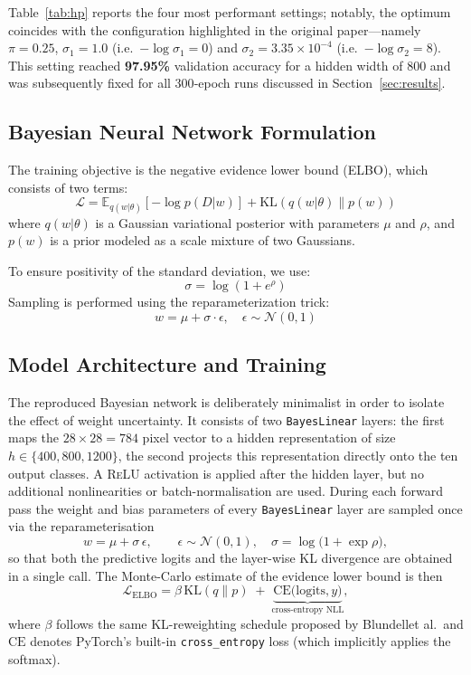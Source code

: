 \documentclass{article}
\begin{document}
Table~\ref{tab:hp} reports the four most performant settings; notably, the optimum coincides with the configuration highlighted in the original paper—namely $\pi=0.25$, $\sigma_{1}=1.0$ (i.e.\ $-\!\log\sigma_1=0$) and $\sigma_{2}=3.35\times10^{-4}$ (i.e.\ $-\!\log\sigma_2=8$).  
This setting reached \textbf{97.95\%} validation accuracy for a hidden width of 800 and was subsequently fixed for all 300‑epoch runs discussed in Section~\ref{sec:results}.

\subsection{Bayesian Neural Network Formulation}

The training objective is the negative evidence lower bound (ELBO), which consists of two terms:
\[
\mathcal{L} = \mathbb{E}_{q(w|\theta)} [-\log p(D|w)] + \mathrm{KL}(q(w|\theta) \| p(w))
\]
where $q(w|\theta)$ is a Gaussian variational posterior with parameters $\mu$ and $\rho$, and $p(w)$ is a prior modeled as a scale mixture of two Gaussians.

To ensure positivity of the standard deviation, we use:
\[
\sigma = \log(1 + e^{\rho})
\]
Sampling is performed using the reparameterization trick:
\[
w = \mu + \sigma \cdot \epsilon, \quad \epsilon \sim \mathcal{N}(0, 1)
\]


\subsection{Model Architecture and Training}

The reproduced Bayesian network is deliberately minimalist in order to isolate the effect of weight uncertainty.  It consists of two \texttt{BayesLinear} layers: the first maps the $28\times28=784$ pixel vector to a hidden representation of size $h\in\{400,800,1200\}$, the second projects this representation directly onto the ten output classes.  A \textsc{ReLU} activation is applied after the hidden layer, but no additional nonlinearities or batch-normalisation are used.  During each forward pass the weight and bias parameters of every \texttt{BayesLinear} layer are sampled once via the reparameterisation
\[
w = \mu + \sigma \,\epsilon,\qquad 
\epsilon\sim\mathcal{N}(0,1),\quad 
\sigma=\log\!\bigl(1+\exp\rho\bigr),
\]
so that both the predictive logits and the layer-wise KL divergence are obtained in a single call.  The Monte-Carlo estimate of the evidence lower bound is then
\[
\mathcal{L}_{\text{ELBO}} = \beta\,\text{KL}(q\|p)\;+\;
\underbrace{\text{CE}\bigl(\text{logits},y\bigr)}_{\text{cross-entropy NLL}},
\]
where $\beta$ follows the same KL-reweighting schedule proposed by Blundell\;et al.\ and $\text{CE}$ denotes PyTorch’s built-in \texttt{cross\_entropy} loss (which implicitly applies the softmax).
\end{document}

